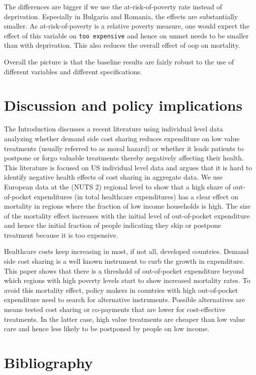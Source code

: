 \documentclass[a4paper,12pt]{article}
\begin{document}
The differences are bigger if we use the at-risk-of-poverty rate instead of deprivation. Especially in Bulgaria and Romania, the effects are substantially smaller. As at-risk-of-poverty is a relative poverty measure, one would expect the effect of this variable on \texttt{too expensive} and hence on unmet needs to be smaller than with deprivation. This also reduces the overall effect of oop on mortality.

Overall the picture is that the baseline results are fairly robust to the use of different variables and different specifications. 


\section{Discussion and policy implications}
\label{sec:orgefae3a5}

The Introduction discusses a recent literature using individual level data analyzing whether demand side cost sharing reduces expenditure on low value treatments (usually referred to as moral hazard) or whether it leads patients to postpone or forgo valuable treatments thereby negatively affecting their health. This literature is focused on US individual level data and argues that it is hard to identify negative health effects of cost sharing in aggregate data. We use European data at the (NUTS 2) regional level to show that a high share of out-of-pocket expenditures (in total healthcare expenditures) has a clear effect on mortality in regions where the fraction of low income households is high. The size of the mortality effect increases with the initial level of out-of-pocket expenditure and hence the initial fraction of people indicating they skip or postpone treatment because it is too expensive.

Healthcare costs keep increasing in most, if not all, developed countries. Demand side cost sharing is a well known instrument to curb the growth in expenditure. This paper shows that there is a threshold of out-of-pocket expenditure beyond which regions with high poverty levels start to show increased mortality rates. To avoid this mortality effect, policy makers in countries with high out-of-pocket expenditure need to search for alternative instruments. Possible alternatives are means tested cost sharing or co-payments that are lower for cost-effective treatments. In the latter case, high value treatments are cheaper than low value care and hence less likely to be postponed by people on low income.


\section{Bibliography}
\label{sec:org0fcd4d5}
\end{document}
